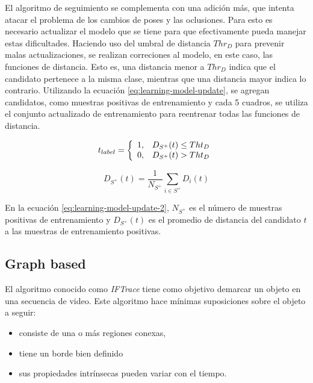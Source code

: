 \documentclass[a4paper,10pt]{article}
\begin{document}
El algoritmo de seguimiento se complementa con una adición más, que 
intenta atacar el problema de los cambios de poses y las oclusiones.
Para esto es necesario actualizar el modelo que se tiene para 
que efectivamente pueda manejar estas dificultades. 
Haciendo uso del umbral de distancia $Thr_{D}$ para prevenir
malas actualizaciones, se realizan correciones al modelo,
en este caso, las funciones de distancia. Esto es, una distancia
menor a $Thr_{D}$ indica que el candidato pertenece a la misma clase,
mientras que una distancia mayor indica lo contrario. Utilizando 
la ecuación \ref{eq:learning-model-update}, se agregan candidatos,
como muestras positivas de entrenamiento y cada 5 cuadros, 
se utiliza el conjunto actualizado de entrenamiento para 
reentrenar todas las funciones de distancia.

\begin{equation}
    \label{eq:learning-model-update-1}
    t_{label} = \left\{ 
                \begin{array}{l l}
                    1, & D_{S^{+}}(t) \leq Tht_{D}\\
                    0, & D_{S^{+}}(t) >  Tht_{D}
                \end{array} \right.
\end{equation}

\begin{equation}
    \label{eq:learning-model-update-1}
    D_{S^{+}}(t) = \dfrac{1}{N_{S^{+}}} \sum_{i \in S^{+}} D_{i}(t)
\end{equation}

En la ecuación \ref{eq:learning-model-update-2}, $N_{S^{+}}$ es el 
número de muestras positivas de entrenamiento y $D_{S^{+}}(t)$
es el promedio de distancia del candidato $t$ a las muestras
de entrenamiento positivas.

\subsection{Graph based}

El algoritmo conocido como \textit{IFTrace} \cite{IFTrace} tiene como objetivo demarcar un objeto en una secuencia de video. Este algoritmo hace mínimas
suposiciones sobre el objeto a seguir:

\begin{itemize}
    \item consiste de una o más regiones conexas, 
    \item tiene un borde bien definido
    \item sus propiedades intrínsecas pueden variar con el tiempo.
\end{itemize}
\end{document}
